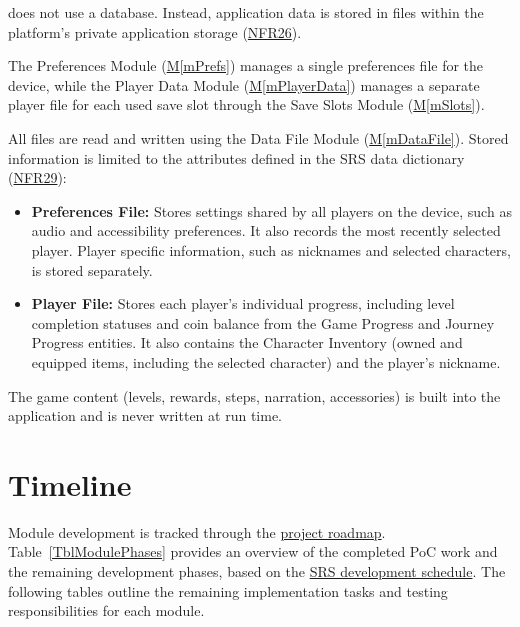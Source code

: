 \documentclass[10pt, titlepage]{article}
\newcommand{\srsurl}{https://team-hindsight.github.io/ophthamology-game/SRS/SRS.pdf}
\newcommand{\srsitemref}[2]{\href{\srsurl\#nameddest=#1}{#2}}
\newcommand{\mref}[1]{\texorpdfstring{\hyperref[md:#1]{M\ref*{#1}}}{M\ref*{#1}}}
\begin{document}
\progname{} does not use a database. Instead, application data is stored
in files within the platform's private application storage
(\srsitemref{NFR_DataProtection}{NFR26}).

The Preferences Module (\mref{mPrefs}) manages a single preferences file
for the device, while the Player Data Module (\mref{mPlayerData}) manages
a separate player file for each used save slot through the Save Slots
Module (\mref{mSlots}).

All files are read and written using the Data File Module
(\mref{mDataFile}). Stored information is limited to the attributes
defined in the SRS data dictionary
(\srsitemref{NFR_Minimization}{NFR29}):

\begin{itemize}
    \item \textbf{Preferences File:} Stores settings shared by all
    players on the device, such as audio and accessibility
    preferences. It also records the most recently selected
    player. Player specific information, such as nicknames
    and selected characters, is stored separately.

    \item \textbf{Player File:} Stores each player's individual
    progress, including level completion statuses and coin balance
    from the Game Progress and Journey Progress entities.
    It also contains the Character Inventory (owned and equipped
    items, including the selected character) and the player's nickname.
\end{itemize}


The game content (levels, rewards, steps, narration, accessories) is built into
the application and is never written at run time.

\newpage
\section{Timeline}\label{SecTimeline}

Module development is tracked through the
\href{https://github.com/orgs/team-hindsight/projects/1/views/2}{project roadmap}.
Table~\ref{TblModulePhases} provides an overview of the completed PoC work
and the remaining development phases, based on the
\srsitemref{tab:DevelopmentPhases}{SRS development schedule}.
The following tables outline the remaining implementation tasks
and testing responsibilities for each module.
\end{document}

